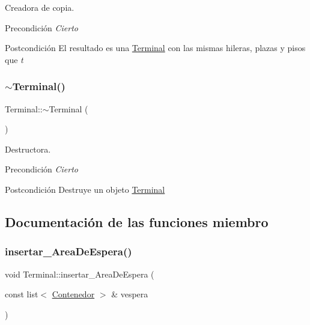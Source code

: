 Creadora de copia. 

\begin{DoxyPrecond}{Precondición}
{\itshape Cierto} 
\end{DoxyPrecond}
\begin{DoxyPostcond}{Postcondición}
El resultado es una \hyperlink{class_terminal}{Terminal} con las mismas hileras, plazas y pisos que {\itshape t} 
\end{DoxyPostcond}
\mbox{\label{class_terminal_add5a7d4dd45b68af9a0afb1cc845af2f}} 
\subsubsection{\texorpdfstring{$\sim$\+Terminal()}{~Terminal()}}
{\footnotesize\ttfamily Terminal\+::$\sim$\+Terminal (\begin{DoxyParamCaption}{ }\end{DoxyParamCaption})}



Destructora. 

\begin{DoxyPrecond}{Precondición}
{\itshape Cierto} 
\end{DoxyPrecond}
\begin{DoxyPostcond}{Postcondición}
Destruye un objeto \hyperlink{class_terminal}{Terminal} 
\end{DoxyPostcond}


\subsection{Documentación de las funciones miembro}
\mbox{\label{class_terminal_a7b12f84e1eeb3dacb6d73f6126bb13e1}} 
\subsubsection{\texorpdfstring{insertar\+\_\+\+Area\+De\+Espera()}{insertar\_AreaDeEspera()}}
{\footnotesize\ttfamily void Terminal\+::insertar\+\_\+\+Area\+De\+Espera (\begin{DoxyParamCaption}\item[{const list$<$ \hyperlink{class_contenedor}{Contenedor} $>$ \&}]{vespera }\end{DoxyParamCaption})}



